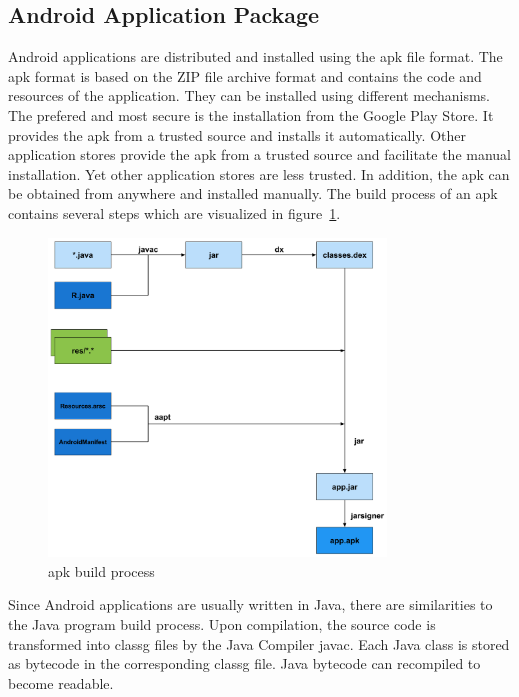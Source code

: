 \subsection{Android Application Package} \label{subsection:foundation-android-package}
Android applications are distributed and installed using the \gls{apk} file format.
The \gls{apk} format is based on the ZIP file archive format and contains the code and resources of the application.
They can be installed using different mechanisms.
The prefered and most secure is the installation from the Google Play Store.
It provides the \gls{apk} from a trusted source and installs it automatically.
Other application stores provide the \gls{apk} from a trusted source and facilitate the manual installation.
Yet other application stores are less trusted.
In addition, the \gls{apk} can be obtained from anywhere and installed manually.
The build process of an \gls{apk} contains several steps which are visualized in figure~\ref{fig:apk}.
\newline
\begin{figure}[h]
    \centering
    \includegraphics[width=0.8\textwidth]{data/apk.png}
    \caption{\gls{apk} build process \cite{andevconDalvikART}}
    \label{fig:apk}
\end{figure}
\newline
Since Android applications are usually written in Java, there are similarities to the Java program build process.
Upon compilation, the source code is transformed into \gls{classg} files by the Java Compiler javac.
Each Java class is stored as bytecode in the corresponding \gls{classg} file.
Java bytecode can recompiled to become readable.
